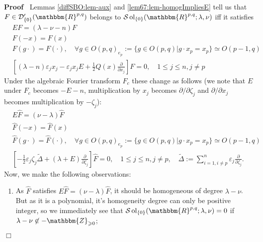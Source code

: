 \documentclass{article}
\newcommand{\assign}{:=}
\newcommand{\nin}{\not\in}
\newcommand{\nocomma}{}
\newcommand{\tmop}[1]{\ensuremath{\operatorname{#1}}}
\newenvironment{proof}{\noindent\textbf{Proof\ }}{\hspace*{\fill}$\Box$\medskip}
\numberwithin{definition}{section}
\numberwithin{lemma}{section}
\numberwithin{proposition}{section}
{\theorembodyfont{\rmfamily}\newtheorem{remark}{Remark}
\numberwithin{remark}{section}
}
\begin{document}
\begin{proof}
  Lemmas \ref{diffSBO:lem-aux} and \ref{lem67:lem-homogImpliesE} tell us that
  $F \in \mathcal{D}'_{\{ 0 \}} ( \mathbbm{R}^{p, q})$ belongs to $\mathcal{S}
  \tmop{ol}_{\{ 0 \}} ( \mathbbm{R}^{p, q} ; \lambda, \nu)$ iff it satisfies
  \begin{eqnarray}
    & E F = ( \lambda - \nu - n) F &  \nonumber\\
    & F ( - x) = F ( x) &  \nonumber\\
    & F ( g \cdot) = F ( \cdot), \hspace{1em} \forall g \in O ( p, q)_{e_p}
    \assign \{ g \in O ( p, q) | g \cdot x_p = x_p \} \simeq O ( p - 1, q) & 
    \nonumber\\
    & \left[ (\lambda - n) \varepsilon_j x_j - \varepsilon_j x_j E +
    \frac{1}{2} Q (x) \frac{\partial}{\partial x_j} \right] F = 0,
    \hspace{1em} 1 \leqslant j \leqslant n, j \neq p &  \nonumber
  \end{eqnarray}
  Under the algebraic Fourier transform $F_c$ these change as follows (we note
  that $E$ under $F_c$ becomes $- E - n$, multiplication by $x_j$ becomes
  $\partial / \partial \zeta_j$ and $\partial / \partial x_j$ becomes
  multiplication by $- \zeta_j$):
  \begin{eqnarray}
    & E \hat{F} = ( \nu - \lambda) \hat{F} &  \nonumber\\
    & \hat{F} ( - x) = \hat{F} ( x) &  \nonumber\\
    & \hat{F} ( g \cdot) = \hat{F} ( \cdot), \hspace{1em} \forall g \in O (
    p, q)_{e_p} \assign \{ g \in O ( p, q) | g \cdot x_p = x_p \} \simeq O ( p
    - 1, q) &  \nonumber\\
    & \left[ - \frac{1}{2} \varepsilon_j \zeta_j \tilde{\Delta} + ( \lambda +
    E) \frac{\partial}{\partial \zeta_j} \right] \hat{F} = 0, \hspace{1em} 1
    \leqslant j \leqslant n, j \neq p, \hspace{1em} \tilde{\Delta} \assign
    \sum_{i = 1, i \neq p}^n \varepsilon_j \frac{\partial}{\partial \zeta_j} .
    &  \nonumber
  \end{eqnarray}
  Now, we make the following observations:
  \begin{enumerate}
    \item As $\hat{F}$ satisfies $E \hat{F} = ( \nu - \lambda) \hat{F}
    \nocomma$, it should be homogeneous of degree $\lambda - \nu$. But as it
    is a polynomial, it's homogeneity degree can only be positive integer, so
    we immediately see that $\mathcal{S} \tmop{ol}_{\{ 0 \}} ( \mathbbm{R}^{p,
    q} ; \lambda, \nu) = 0$ if $\lambda - \nu \nin -\mathbbm{Z}_{\geqslant
    0}$;
    

\end{enumerate}
\end{proof}
\end{document}
